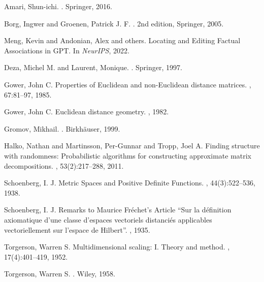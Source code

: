 \documentclass[11pt]{article}
\newcommand{\1}{\mathbf{1}}
\begin{document}
\begin{thebibliography}{99}

Amari, Shun-ichi.
.
\newblock Springer, 2016.

Borg, Ingwer and Groenen, Patrick J. F.
.
\newblock 2nd edition, Springer, 2005.

Meng, Kevin and Andonian, Alex and others.
\newblock Locating and Editing Factual Associations in GPT.
\newblock In {\em NeurIPS}, 2022.

Deza, Michel M. and Laurent, Monique.
.
\newblock Springer, 1997.

Gower, John C.
\newblock Properties of Euclidean and non-Euclidean distance matrices.
, 67:81--97, 1985.

Gower, John C.
\newblock Euclidean distance geometry.
, 1982.

Gromov, Mikhail.
.
\newblock Birkh\"auser, 1999.

Halko, Nathan and Martinsson, Per-Gunnar and Tropp, Joel A.
\newblock Finding structure with randomness: Probabilistic algorithms for constructing approximate matrix decompositions.
, 53(2):217--288, 2011.

Schoenberg, I. J.
\newblock Metric Spaces and Positive Definite Functions.
, 44(3):522--536, 1938.

Schoenberg, I. J.
\newblock Remarks to Maurice Fr\'echet's Article ``Sur la d\'efinition axiomatique d'une classe d'espaces vectoriels distanci\'es applicables vectoriellement sur l'espace de Hilbert''.
, 1935.

Torgerson, Warren S.
\newblock Multidimensional scaling: I. Theory and method.
, 17(4):401--419, 1952.

Torgerson, Warren S.
.
\newblock Wiley, 1958.


\end{thebibliography}
\end{document}
